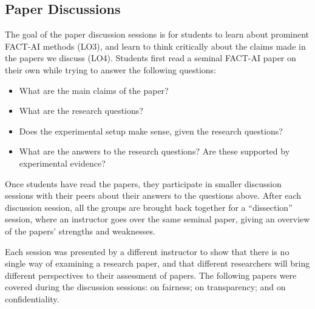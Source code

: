 \subsection{Paper Discussions}
The goal of the paper discussion sessions is for students to learn about prominent FACT-AI methods (LO3), and learn to think critically about the claims made in the papers we discuss (LO4). 
Students first read a seminal FACT-AI paper on their own while trying to answer the following questions: 
\begin{itemize}[leftmargin=*,nosep]
\item What are the main claims of the paper?
\item What are the research questions?
\item Does the experimental setup make sense, given the research questions?
\item What are the answers to the research questions? Are these supported by experimental evidence?
\end{itemize}

\noindent%
Once students have read the papers, they participate in smaller discussion sessions with their peers about their answers to the questions above. 
After each discussion session, all the groups are brought back together for a ``dissection'' session, where an instructor goes over the same seminal paper, giving an overview of the papers' strengths and weaknesses. 

Each session was presented by a different instructor to show that there is no single way of examining a research paper, and that different researchers will bring different perspectives to their assessment of papers. 
The following papers were covered during the discussion sessions: 
\citet{hardt_equality_2016} on fairness; 
\citet{ribeiro_why_2016} on transparency; and 
\citet{Abadi_2016} on confidentiality.

